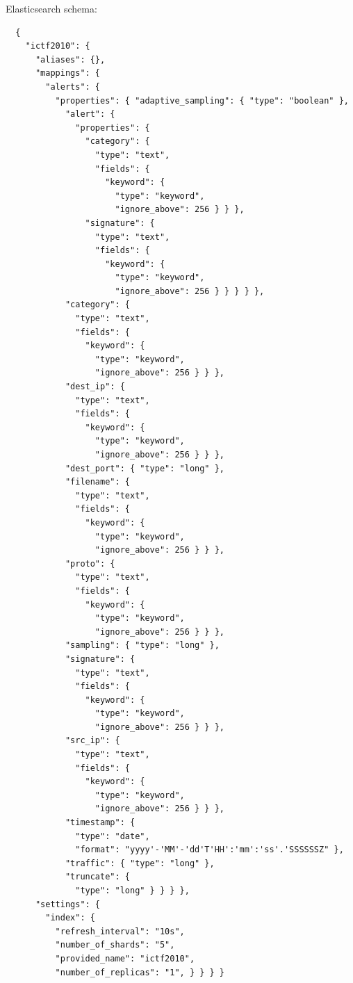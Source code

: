 \documentclass[12pt,a4paper,openright,twoside]{report}
\begin{document}
Elasticsearch schema:
\begin{verbatim}
  {
    "ictf2010": {
      "aliases": {},
      "mappings": {
        "alerts": {
          "properties": { "adaptive_sampling": { "type": "boolean" },
            "alert": {
              "properties": {
                "category": {
                  "type": "text",
                  "fields": {
                    "keyword": {
                      "type": "keyword",
                      "ignore_above": 256 } } },
                "signature": {
                  "type": "text",
                  "fields": {
                    "keyword": {
                      "type": "keyword",
                      "ignore_above": 256 } } } } },
            "category": {
              "type": "text",
              "fields": {
                "keyword": {
                  "type": "keyword",
                  "ignore_above": 256 } } },
            "dest_ip": {
              "type": "text",
              "fields": {
                "keyword": {
                  "type": "keyword",
                  "ignore_above": 256 } } },
            "dest_port": { "type": "long" },
            "filename": {
              "type": "text",
              "fields": {
                "keyword": {
                  "type": "keyword",
                  "ignore_above": 256 } } },
            "proto": {
              "type": "text",
              "fields": {
                "keyword": {
                  "type": "keyword",
                  "ignore_above": 256 } } },
            "sampling": { "type": "long" },
            "signature": {
              "type": "text",
              "fields": {
                "keyword": {
                  "type": "keyword",
                  "ignore_above": 256 } } },
            "src_ip": {
              "type": "text",
              "fields": {
                "keyword": {
                  "type": "keyword",
                  "ignore_above": 256 } } },
            "timestamp": {
              "type": "date",
              "format": "yyyy'-'MM'-'dd'T'HH':'mm':'ss'.'SSSSSSZ" },
            "traffic": { "type": "long" },
            "truncate": {
              "type": "long" } } } },
      "settings": {
        "index": {
          "refresh_interval": "10s",
          "number_of_shards": "5",
          "provided_name": "ictf2010",
          "number_of_replicas": "1", } } } }
\end{verbatim}
\end{document}
